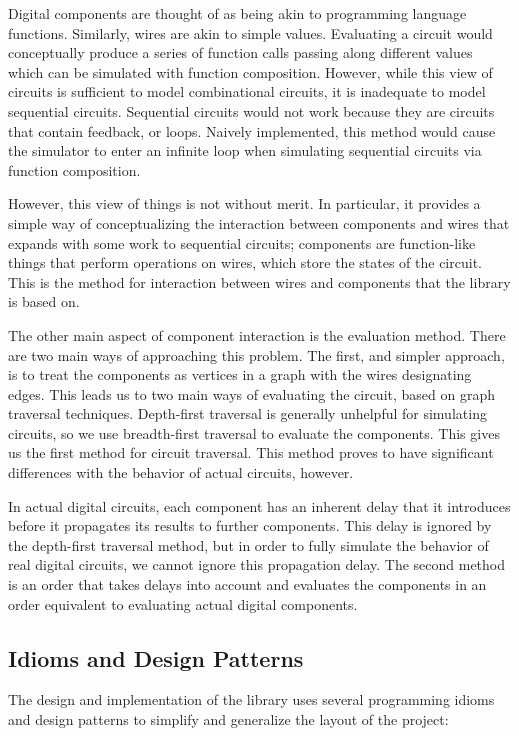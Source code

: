 \documentclass{article}
\begin{document}
Digital components are thought of as being akin to programming language functions. Similarly, wires are akin to simple values. Evaluating a circuit would conceptually produce a series of function calls passing along different values which can be simulated with function composition. However, while this view of circuits is sufficient to model combinational circuits, it is inadequate to model sequential circuits. Sequential circuits would not work because they are circuits that contain feedback, or loops. Naively implemented, this method would cause the simulator to enter an infinite loop when simulating sequential circuits via function composition.

However, this view of things is not without merit. In particular, it provides a simple way of conceptualizing the interaction between components and wires that expands with some work to sequential circuits; components are function-like things that perform operations on wires, which store the states of the circuit. This is the method for interaction between wires and components that the library is based on.

The other main aspect of component interaction is the evaluation method. There are two main ways of approaching this problem. The first, and simpler approach, is to treat the components as vertices in a graph with the wires designating edges. This leads us to two main ways of evaluating the circuit, based on graph traversal techniques. Depth-first traversal is generally unhelpful for simulating circuits, so we use breadth-first traversal to evaluate the components. This gives us the first method for circuit traversal. This method proves to have significant differences with the behavior of actual circuits, however.

In actual digital circuits, each component has an inherent delay that it introduces before it propagates its results to further components. This delay is ignored by the depth-first traversal method, but in order to fully simulate the behavior of real digital circuits, we cannot ignore this propagation delay. The second method is an order that takes delays into account and evaluates the components in an order equivalent to evaluating actual digital components.

\subsection{Idioms and Design Patterns}

The design and implementation of the library uses several programming idioms and design patterns\cite{Gamma-1995} to simplify and generalize the layout of the project:
\end{document}
